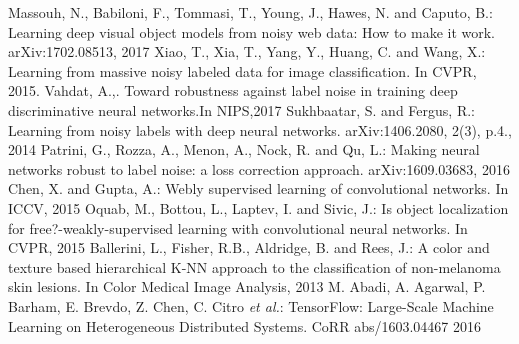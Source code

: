 \documentclass{llncs}
\begin{document}
\begin{thebibliography}{50}
Massouh, N., Babiloni, F., Tommasi, T., Young, J., Hawes, N. and Caputo, B.:
Learning deep visual object models from noisy web data: How to make it work. arXiv:1702.08513, 2017
Xiao, T., Xia, T., Yang, Y., Huang, C. and Wang, X.: Learning from massive noisy labeled data for image classification. In CVPR, 2015.
Vahdat, A.,. Toward robustness against label noise in training deep discriminative neural networks.In NIPS,2017
Sukhbaatar, S. and Fergus, R.:
Learning from noisy labels with deep neural networks. arXiv:1406.2080, 2(3), p.4., 2014
Patrini, G., Rozza, A., Menon, A., Nock, R. and Qu, L.:
Making neural networks robust to label noise: a loss correction approach. arXiv:1609.03683, 2016
Chen, X. and Gupta, A.:
Webly supervised learning of convolutional networks. In ICCV, 2015
Oquab, M., Bottou, L., Laptev, I. and Sivic, J.:
Is object localization for free?-weakly-supervised learning with convolutional neural networks. In CVPR, 2015
Ballerini, L., Fisher, R.B., Aldridge, B. and Rees, J.:
A color and texture based hierarchical K-NN approach to the classification of non-melanoma skin lesions. In Color Medical Image Analysis, 2013
M. Abadi, A. Agarwal, P. Barham, E. Brevdo, Z. Chen, C. Citro \textit{et al.}:
TensorFlow: Large-Scale Machine Learning on Heterogeneous Distributed Systems. CoRR abs/1603.04467 2016






\end{thebibliography}
\end{document}
